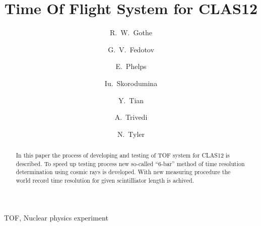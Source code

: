 \documentclass[preprint,12pt]{elsarticle}
\numberwithin{equation}{section}
\begin{document}
\begin{frontmatter}



\title{Time Of Flight System for CLAS12}

\author[USC]{R.~W.~Gothe}
\author[USC]{G.~V.~Fedotov}
\author[USC]{E.~Phelps}
\author[USC]{Iu.~Skorodumina}
\author[USC]{Y.~Tian}
\author[USC]{A.~Trivedi}
\author[USC]{N.~Tyler}

\address[USC]{University of South Carolina, Columbia, South Carolina 29208}

\author{}

\address{}

\begin{abstract}
In this paper the process of developing and testing of TOF system for CLAS12 is described. To speed up testing process new so-called ``6-bar'' method of time resolution determination using cosmic rays is developed. With new measuring procedure the world record time resolution for given scintilliator length is achived.  

\end{abstract}

\begin{keyword}
TOF, Nuclear physics experiment


\end{keyword}

\end{frontmatter}


\pagebreak






































\pagebreak
\newpage



\end{document}
